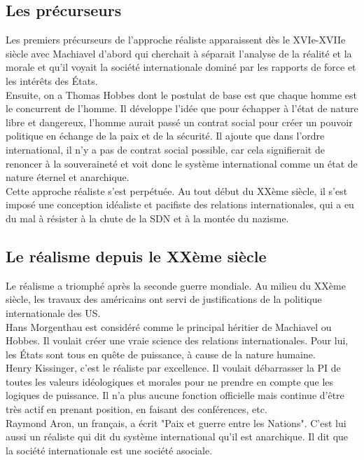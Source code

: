 \documentclass[10pt, a4paper, openany]{book}
\begin{document}
\subsection{Les précurseurs}

Les premiers précurseurs de l'approche réaliste apparaissent dès le XVIe-XVIIe siècle avec Machiavel d'abord qui cherchait à séparait l'analyse de la réalité et la morale et qu'il voyait la société internationale dominé par les rapports de force et les intérêts des États. \\
Ensuite, on a Thomas Hobbes dont le postulat de base est que chaque homme est le concurrent de l'homme. Il développe l'idée que pour échapper à l'état de nature libre et dangereux, l'homme aurait passé un contrat social pour créer un pouvoir politique en échange de la paix et de la sécurité. Il ajoute que dans l'ordre international, il n'y a pas de contrat social possible, car cela signifierait de renoncer à la souveraineté et voit donc le système international comme un état de nature éternel et anarchique. \\
Cette approche réaliste s'est perpétuée. Au tout début du XXème siècle, il s'est imposé une conception idéaliste et pacifiste des relations internationales, qui a eu du mal à résister à la chute de la SDN et à la montée du nazisme.

\subsection{Le réalisme depuis le XXème siècle}

Le réalisme a triomphé après la seconde guerre mondiale. Au milieu du XXème siècle, les travaux des américains ont servi de justifications de la politique internationale des US. \\
Hans Morgenthau est considéré comme le principal héritier de Machiavel ou Hobbes. Il voulait créer une vraie science des relations internationales. Pour lui, les États sont tous en quête de puissance, à cause de la nature humaine. \\
Henry Kissinger, c'est le réaliste par excellence. Il voulait débarrasser la PI de toutes les valeurs idéologiques et morales pour ne prendre en compte que les logiques de puissance. Il n'a plus aucune fonction officielle mais continue d'être très actif en prenant position, en faisant des conférences, etc. \\
Raymond Aron, un français, a écrit "Paix et guerre entre les Nations". C'est lui aussi un réaliste qui dit du système international qu'il est anarchique. Il dit que la société internationale est une société asociale. 
\end{document}
